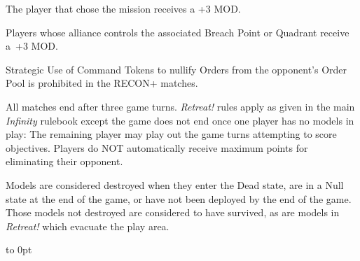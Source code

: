 \begin{squishitemize}
\item The player that chose the mission receives a +3 MOD.

\item Players whose alliance controls the associated Breach Point or
  Quadrant receive a~+3 MOD.
\end{squishitemize}

  Strategic Use of Command Tokens
to nullify Orders from the opponent's Order Pool is prohibited in the
RECON+ matches.

  All matches end after three game turns.
\emph{Retreat!} rules apply as given in the main \emph{Infinity}
rulebook except the game does not end once one player has no models in
play: The remaining player may play out the game turns attempting to
score objectives.  Players do NOT automatically receive maximum points
for eliminating their opponent.

 Models are considered destroyed when they
enter the Dead state, are in a Null state at the end of the game, or
have not been deployed by the end of the game.  Those models not
destroyed are considered to have survived, as are models in
\emph{Retreat!} which evacuate the play area.

\vfill
\vbox to 0pt{}
